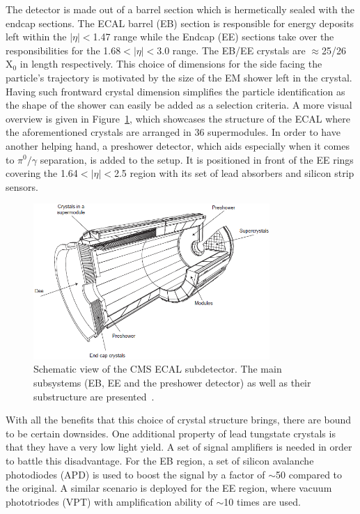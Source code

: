 \hspace{10pt} The detector is made out of a barrel section which is hermetically sealed with the endcap sections. The ECAL barrel (EB) section is responsible for energy deposits left within the $|\eta|<$1.47 range while the Endcap (EE) sections take over the responsibilities for the 1.68$<|\eta|<$3.0 range. The EB/EE crystals are $\approx$25/26 X$_\text{0}$ in length respectively. This choice of dimensions for the side facing the particle's trajectory is motivated by the size of the EM shower left in the crystal. Having such frontward crystal dimension simplifies the particle identification as the shape of the shower can easily be added as a selection criteria. A more visual overview is given in Figure~\ref{fig:ecal}, which showcases the structure of the ECAL where the aforementioned crystals are arranged in 36 supermodules. In order to have another helping hand, a preshower detector, which aids especially when it comes to $\pi^\text{0}/\gamma$ separation, is added to the setup. It is positioned in front of the EE rings covering the 1.64$<|\eta|<$2.5 region with its set of lead absorbers and silicon strip sensors.
\begin{figure}[htbp]
  \centering
    \includegraphics[width=0.8\textwidth]{CMS_experiment/CMS_ECAL.png}
  \caption[Schematic view of the CMS ECAL subdetector. The main subsystems (EB, EE and the preshower detector) as well as their substructure are presented.]{Schematic view of the CMS ECAL subdetector. The main subsystems (EB, EE and the preshower detector) as well as their substructure are presented~\cite{cms:ecal}.}
  \label{fig:ecal}
\end{figure}

\hspace{10pt} With all the benefits that this choice of crystal structure brings, there are bound to be certain downsides. One additional property of lead tungstate crystals is that they have a very low light yield.  A set of signal amplifiers is needed in order to battle this disadvantage. For the EB region, a set of silicon avalanche photodiodes (APD) is used to boost the signal by a factor of $\sim$50 compared to the original. A similar scenario is deployed for the EE region, where vacuum phototriodes (VPT) with amplification ability of $\sim$10 times are used.


